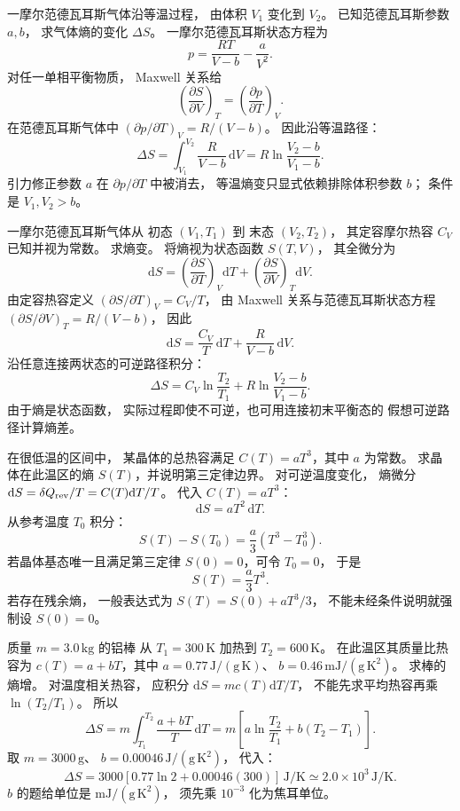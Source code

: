 一摩尔范德瓦耳斯气体沿等温过程，
由体积 $V_1$ 变化到 $V_2$。
已知范德瓦耳斯参数 $a,b$，
求气体熵的变化 $\Delta S$。
\exsolution
一摩尔范德瓦耳斯状态方程为
\[
p=\frac{RT}{V-b}-\frac a{V^2}.
\]
对任一单相平衡物质，
Maxwell 关系给
\[
\left(\frac{\partial S}{\partial V}\right)_T
=\left(\frac{\partial p}{\partial T}\right)_V.
\]
在范德瓦耳斯气体中
$(\partial p/\partial T)_V=R/(V-b)$。
因此沿等温路径：
\[
\Delta S=\int_{V_1}^{V_2}
\frac R{V-b}\,\mathrm dV
=\boxed{R\ln\frac{V_2-b}{V_1-b}}.
\]
\excheck 引力修正参数 $a$ 在
$\partial p/\partial T$ 中被消去，
等温熵变只显式依赖排除体积参数 $b$；
条件是 $V_1,V_2>b$。

一摩尔范德瓦耳斯气体从
初态 $(V_1,T_1)$ 到
末态 $(V_2,T_2)$，
其定容摩尔热容 $C_V$ 已知并视为常数。
求熵变。
\exsolution
将熵视为状态函数 $S(T,V)$，
其全微分为
\[
\mathrm dS=
\left(\frac{\partial S}{\partial T}\right)_V\mathrm dT+
\left(\frac{\partial S}{\partial V}\right)_T\mathrm dV.
\]
由定容热容定义
$(\partial S/\partial T)_V=C_V/T$，
由 Maxwell 关系与范德瓦耳斯状态方程
$(\partial S/\partial V)_T=R/(V-b)$，
因此
\[
\mathrm dS=\frac{C_V}{T}\,\mathrm dT+
\frac R{V-b}\,\mathrm dV.
\]
沿任意连接两状态的可逆路径积分：
\[
\boxed{\Delta S=C_V\ln\frac{T_2}{T_1}
+R\ln\frac{V_2-b}{V_1-b}}.
\]
\excheck 由于熵是状态函数，
实际过程即使不可逆，也可用连接初末平衡态的
假想可逆路径计算熵差。

在很低温的区间中，
某晶体的总热容满足
$C(T)=aT^3$，其中 $a$ 为常数。
求晶体在此温区的熵
$S(T)$，并说明第三定律边界。
\exsolution
对可逆温度变化，
熵微分
$\mathrm dS=\delta Q_{\rm rev}/T
=C(T)\mathrm dT/T$。
代入 $C(T)=aT^3$：
\[
\mathrm dS=aT^2\,\mathrm dT.
\]
从参考温度 $T_0$ 积分：
\[
S(T)-S(T_0)
=\frac a3(T^3-T_0^3).
\]
若晶体基态唯一且满足第三定律
$S(0)=0$，可令 $T_0=0$，
于是
\[
\boxed{S(T)=\frac a3T^3}.
\]
\excheck 若存在残余熵，
一般表达式为
$S(T)=S(0)+aT^3/3$，
不能未经条件说明就强制设 $S(0)=0$。

质量 $m=3.0\,\mathrm{kg}$ 的铝棒
从 $T_1=300\,\mathrm K$ 加热到
$T_2=600\,\mathrm K$。
在此温区其质量比热容为
$c(T)=a+bT$，其中
$a=0.77\,\mathrm{J/(g\,K)}$、
$b=0.46\,\mathrm{mJ/(g\,K^2)}$。
求棒的熵增。
\exsolution
对温度相关热容，
应积分 $\mathrm dS=mc(T)\mathrm dT/T$，
不能先求平均热容再乘 $\ln(T_2/T_1)$。
所以
\[
\Delta S=m\int_{T_1}^{T_2}
\frac{a+bT}{T}\,\mathrm dT
=m\left[a\ln\frac{T_2}{T_1}
+b(T_2-T_1)\right].
\]
取 $m=3000\,\mathrm g$、
$b=0.00046\,\mathrm{J/(g\,K^2)}$，
代入：
\[
\boxed{\Delta S=3000
[0.77\ln2+0.00046(300)]
\,\mathrm{J/K}
\simeq2.0\times10^3\,\mathrm{J/K}}.
\]
\excheck $b$ 的题给单位是
$\mathrm{mJ/(g\,K^2)}$，
须先乘 $10^{-3}$ 化为焦耳单位。

